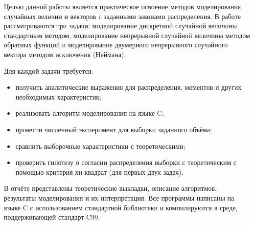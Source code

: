 \documentclass[bachelor, och, pract3]{SCWorks}
\begin{document}


\tableofcontents





\intro

Целью данной работы является практическое освоение методов моделирования случайных величин и векторов с заданными законами распределения. В работе рассматриваются три задачи: моделирование дискретной случайной величины стандартным методом, моделирование непрерывной случайной величины методом обратных функций и моделирование двумерного непрерывного случайного вектора методом исключения (Неймана).

Для каждой задачи требуется:
\begin{itemize}
    \item получить аналитические выражения для распределения, моментов и других необходимых характеристик;
    \item реализовать алгоритм моделирования на языке C;
    \item провести численный эксперимент для выборки заданного объёма;
    \item сравнить выборочные характеристики с теоретическими;
    \item проверить гипотезу о согласии распределения выборки с теоретическим с помощью критерия хи-квадрат (для первых двух задач).
\end{itemize}

В отчёте представлены теоретические выкладки, описание алгоритмов, результаты моделирования и их интерпретация. Все программы написаны на языке C с использованием стандартной библиотеки и компилируются в среде, поддерживающей стандарт C99.
\end{document}
